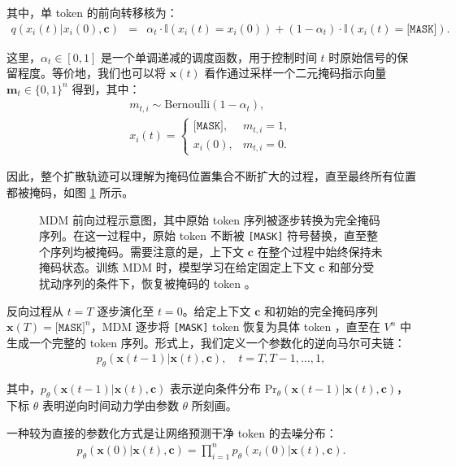 \noindent 其中，单 token 的前向转移核为：
\begin{eqnarray}
q(x_i(t) | x_i(0), \mathbf{c}) & = &\alpha_t \cdot \mathbb{I}(x_i(t)=x_i(0)) + (1-\alpha_t)\cdot \mathbb{I}(x_i(t)=\texttt{[MASK]}). \label{eq:mdm-forward-absorbing}
\end{eqnarray}

\noindent 这里，$\alpha_t \in [0,1]$ 是一个单调递减的调度函数，用于控制时间 $t$ 时原始信号的保留程度。等价地，我们也可以将 $\mathbf{x}(t)$ 看作通过采样一个二元掩码指示向量 $\mathbf{m}_t\in\{0,1\}^n$ 得到，其中：
\begin{eqnarray}
m_{t,i} \sim \mathrm{Bernoulli}(1-\alpha_t), \\
x_i(t) = \begin{cases}
\texttt{[MASK]}, & m_{t,i}=1, \\
x_i(0), & m_{t,i}=0.
\end{cases}
\label{eq:mdm-forward-maskvar}
\end{eqnarray}

\noindent 因此，整个扩散轨迹可以理解为掩码位置集合不断扩大的过程，直至最终所有位置都被掩码，如图 \ref{fig:mdm-diffusion-process} 所示。

\begin{figure}[!t]
\centering
{}
\caption{MDM 前向过程示意图，其中原始 token 序列被逐步转换为完全掩码序列。在这一过程中，原始 token 不断被 \texttt{[MASK]} 符号替换，直至整个序列均被掩码。需要注意的是，上下文 $\mathbf{c}$ 在整个过程中始终保持未掩码状态。训练 MDM 时，模型学习在给定固定上下文 $\mathbf{c}$ 和部分受扰动序列的条件下，恢复被掩码的 token 。}
\label{fig:mdm-diffusion-process}
\end{figure}

反向过程从 $t=T$ 逐步演化至 $t=0$。给定上下文 $\mathbf{c}$ 和初始的完全掩码序列 $\mathbf{x}(T)=\texttt{[MASK]}^n$，MDM 逐步将 \texttt{[MASK]}  token 恢复为具体 token ，直至在 $V^n$ 中生成一个完整的 token 序列。形式上，我们定义一个参数化的逆向马尔可夫链：
\begin{eqnarray}
p_\theta(\mathbf{x}(t-1)| \mathbf{x}(t), \mathbf{c}), \quad t=T,T-1,\dots,1,
\label{eq:mdm-reverse-kernel}
\end{eqnarray}

\noindent 其中，$p_\theta(\mathbf{x}(t-1)| \mathbf{x}(t),\mathbf{c})$ 表示逆向条件分布 $\mathrm{Pr}_\theta(\mathbf{x}(t-1)| \mathbf{x}(t),\mathbf{c})$，下标 $\theta$ 表明逆向时间动力学由参数 $\theta$ 所刻画。

一种较为直接的参数化方式是让网络预测干净 token 的去噪分布：
\begin{eqnarray}
p_\theta(\mathbf{x}(0)| \mathbf{x}(t), \mathbf{c}) = \prod_{i=1}^{n} p_\theta(x_i(0)| \mathbf{x}(t), \mathbf{c}).
\label{eq:mdm-denoise-factorize}
\end{eqnarray}

